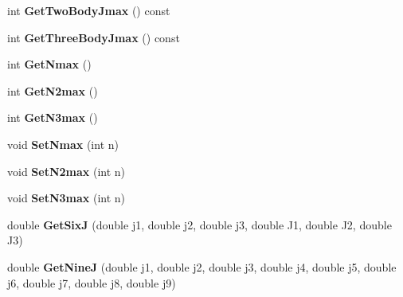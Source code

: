 \begin{DoxyCompactItemize}
\item 
\hypertarget{classModelSpace_a3cbf323130388fae05fed1b59c5bac90}{int {\bfseries Get\-Two\-Body\-Jmax} () const }\label{classModelSpace_a3cbf323130388fae05fed1b59c5bac90}

\item 
\hypertarget{classModelSpace_a23ec9e8797755abfc0986b2e2c73a056}{int {\bfseries Get\-Three\-Body\-Jmax} () const }\label{classModelSpace_a23ec9e8797755abfc0986b2e2c73a056}

\item 
\hypertarget{classModelSpace_aa17b852a2902e4ec22a5c87f53de2dea}{int {\bfseries Get\-Nmax} ()}\label{classModelSpace_aa17b852a2902e4ec22a5c87f53de2dea}

\item 
\hypertarget{classModelSpace_a415e7663769bcab236a66c9914f9ff13}{int {\bfseries Get\-N2max} ()}\label{classModelSpace_a415e7663769bcab236a66c9914f9ff13}

\item 
\hypertarget{classModelSpace_a15a5f8ef44f769c052ae1ae5d475fc01}{int {\bfseries Get\-N3max} ()}\label{classModelSpace_a15a5f8ef44f769c052ae1ae5d475fc01}

\item 
\hypertarget{classModelSpace_a1a50d734edaef5cb3bd79a4707ef1e82}{void {\bfseries Set\-Nmax} (int n)}\label{classModelSpace_a1a50d734edaef5cb3bd79a4707ef1e82}

\item 
\hypertarget{classModelSpace_ab13111671fc76cf1c52b98a3f78a1dcd}{void {\bfseries Set\-N2max} (int n)}\label{classModelSpace_ab13111671fc76cf1c52b98a3f78a1dcd}

\item 
\hypertarget{classModelSpace_a432f3913aa487bf7fc7c4eb5a2197599}{void {\bfseries Set\-N3max} (int n)}\label{classModelSpace_a432f3913aa487bf7fc7c4eb5a2197599}

\item 
\hypertarget{classModelSpace_a716c2bf4a6b42c1c27579b0b7804252e}{double {\bfseries Get\-Six\-J} (double j1, double j2, double j3, double J1, double J2, double J3)}\label{classModelSpace_a716c2bf4a6b42c1c27579b0b7804252e}

\item 
\hypertarget{classModelSpace_ab9303a5a0cc4513bf4ed4430d9fe86a6}{double {\bfseries Get\-Nine\-J} (double j1, double j2, double j3, double j4, double j5, double j6, double j7, double j8, double j9)}\label{classModelSpace_ab9303a5a0cc4513bf4ed4430d9fe86a6}


\end{DoxyCompactItemize}
